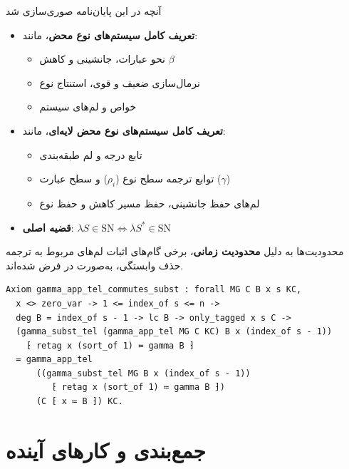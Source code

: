 \documentclass[12pt, aspectratio=169]{beamer}
\begin{document}
\begin{frame}{آنچه در این پایان‌نامه صوری‌سازی شد}

{\small
  \begin{itemize}
  \item \textbf{تعریف کامل سیستم‌های نوع محض}، مانند:
    \begin{itemize}
    \item نحو عبارات، جانشینی و کاهش $\beta$
    \item نرمال‌سازی ضعیف و قوی، استنتاج نوع
    \item خواص و لم‌های سیستم
    \end{itemize}
  \item \textbf{تعریف کامل سیستم‌های نوع محض لایه‌ای}، مانند:
    \begin{itemize}
    \item تابع درجه و لم طبقه‌بندی
    \item توابع ترجمه سطح نوع ($\rho_i$) و سطح عبارت ($\gamma$)
    \item لم‌های حفظ جانشینی، حفظ مسیر کاهش و حفظ نوع
    \end{itemize}
  \item \textbf{قضیه اصلی}: $\lambda S \in \mathrm{SN} \iff \lambda S^* \in \mathrm{SN}$
  \end{itemize}
}

\end{frame}

\begin{frame}[fragile]{محدودیت‌ها}
به دلیل
\textbf{محدودیت زمانی}،
برخی گام‌های اثبات لم‌های مربوط به ترجمه حذف وابستگی، به‌صورت  در  فرض شده‌اند.

\begin{latin}
\setmonofont{DejaVu Sans Mono}
\begin{verbatim}
Axiom gamma_app_tel_commutes_subst : forall MG C B x s KC,
  x <> zero_var -> 1 <= index_of s <= n ->
  deg B = index_of s - 1 -> lc B -> only_tagged x s C ->
  (gamma_subst_tel (gamma_app_tel MG C KC) B x (index_of s - 1))
    ⁅ retag x (sort_of 1) ≔ gamma B ⁆
  = gamma_app_tel
      ((gamma_subst_tel MG B x (index_of s - 1))
         ⁅ retag x (sort_of 1) ≔ gamma B ⁆)
      (C ⁅ x ≔ B ⁆) KC.
\end{verbatim}
\end{latin}

\end{frame}

\section{جمع‌بندی و کارهای آینده}
\end{document}
